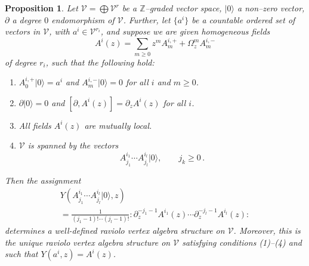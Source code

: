 \documentclass[10pt,a4paper]{amsart}
\newtheorem{prop}{Proposition}
\begin{document}
\begin{prop}
\label{prop:rectheorem}
Let $\mathcal V = \bigoplus \mathcal V^r$ be a $\mathbb Z$--graded vector space, 
$|0\rangle$ a non--zero vector, $\partial$ a degree $0$ endomorphism of $\mathcal V$. 
Further, let $\{a^i\}$ be a countable ordered set of vectors in $\mathcal V$, 
with $a^i \in \mathcal V^{r_i}$, and suppose we are given homogeneous fields
\begin{equation}
    A^i(z) = \sum_{m\geq 0} z^{m} A^{i,+}_m +  \Omega^m_z A^{i,-}_m
\end{equation}
of degree $r_i$, such that the following hold:
\begin{enumerate}
    \item $A^{i,+}_{0}|0\rangle = a^i$ and $A^{i,-}_m |0\rangle = 0$ for all $i$ and $m \geq 0$.
    \item $\partial |0\rangle = 0$ and $[\partial, A^i(z)] = \partial_z A^i(z)$ for all $i$.
    \item All fields $A^i(z)$ are mutually local.
    \item $\mathcal V$ is spanned by the vectors
    \begin{equation}
        A^{i_1}_{j_1} \cdots A^{i_l}_{j_l} |0\rangle, \qquad j_k \geq 0\,.
    \end{equation}
\end{enumerate}
Then the assignment
\begin{multline}
   Y\!\left(A^{i_1}_{j_1}\cdots A^{i_l}_{j_l}|0\rangle, z\right) \\
= \frac{1}{(j_1-1)! \cdots (j_l-1)!} 
:\partial_z^{-j_1-1} A^{i_1}(z) \cdots \partial_z^{-j_l-1} A^{i_l}(z): 
\end{multline}
determines a well-defined raviolo vertex algebra structure on $\mathcal V$. 
Moreover, this is the unique raviolo vertex algebra structure on $\mathcal V$ 
satisfying conditions (1)--(4) and such that $Y(a^i, z) = A^i(z)$.
\end{prop}
\end{document}
